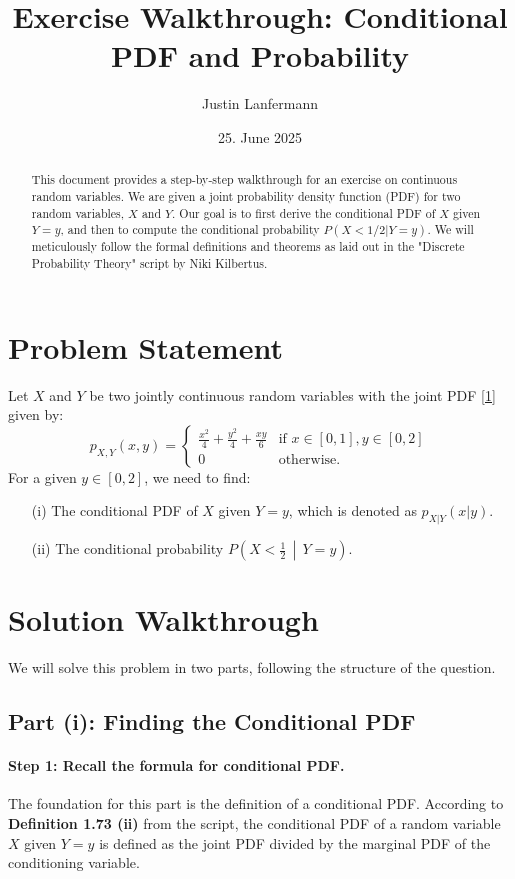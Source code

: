 \documentclass[11pt,a4paper]{article}
\title{Exercise Walkthrough: Conditional PDF and Probability}
\author{Justin Lanfermann}
\date{25. June 2025}
\begin{document}
\maketitle

\begin{abstract}
    This document provides a step-by-step walkthrough for an exercise on continuous random variables. We are given a joint probability density function (PDF) for two random variables, $X$ and $Y$. Our goal is to first derive the conditional PDF of $X$ given $Y=y$, and then to compute the conditional probability $P(X < 1/2 | Y=y)$. We will meticulously follow the formal definitions and theorems as laid out in the "Discrete Probability Theory" script by Niki Kilbertus.
\end{abstract}

\section{Problem Statement}

Let $X$ and $Y$ be two jointly continuous random variables with the joint PDF \hyperlink{note1}{[1]} given by:
\[
p_{X,Y}(x,y) =
\begin{cases}
\frac{x^2}{4} + \frac{y^2}{4} + \frac{xy}{6} & \text{if } x \in [0,1], y \in [0,2] \\
0 & \text{otherwise.}
\end{cases}
\]
For a given $y \in [0,2]$, we need to find:
\begin{enumerate}
    \item[(i)] The conditional PDF of $X$ given $Y=y$, which is denoted as $p_{X|Y}(x|y)$.
    \item[(ii)] The conditional probability $P\left(X < \frac{1}{2} \, \middle| \, Y=y\right)$.
\end{enumerate}

\section{Solution Walkthrough}

We will solve this problem in two parts, following the structure of the question.

\subsection{Part (i): Finding the Conditional PDF}

\paragraph{Step 1: Recall the formula for conditional PDF.}
The foundation for this part is the definition of a conditional PDF. According to \textbf{Definition 1.73 (ii)} from the script, the conditional PDF of a random variable $X$ given $Y=y$ is defined as the joint PDF divided by the marginal PDF of the conditioning variable.
\end{document}

